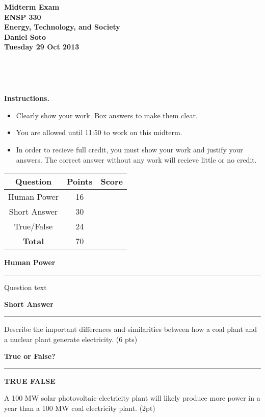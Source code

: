 \documentclass[12pt, oneside]{article}
\newif\ifsolution
\newcommand{\tf}[1]
{
\vfill
\parbox[t]{0.25\textwidth}{\bf TRUE \hspace{0.1 in} FALSE }
\parbox[t]{0.75\textwidth}{#1 (2pt)}
}
\newcommand{\tablerow}[2]
{\rule[-0.3cm]{0cm}{1cm}#1 & #2 & \\ \hline}
\newcommand{\chead}[1]
{\begin{center}\large\textbf{#1}\end{center}
\hrule
\vspace{10pt}}
\newcommand{\solution}[1]
{\ifsolution
Answer: {\it #1}
\else\fi}
\begin{document}
\begin{center}
{\bf Midterm Exam}\\
{\bf ENSP 330}\\
{\bf Energy, Technology, and Society}\\
{\bf Daniel Soto}\\
{\bf Tuesday 29 Oct 2013}\\
\end{center}


\framebox[4.5in]{\rule{0cm}{1.5cm}}\\
\vspace{0.2cm}

\framebox[4.5in]{\rule{0cm}{1.5cm}}\\
\vspace{0.8cm}


\noindent
{\bf Instructions.}
\begin{itemize}
\item Clearly show your work.  Box answers to make them clear.
\item You are allowed until 11:50 to work on this midterm.
\item In order to recieve full credit, you must show your work and
justify your answers.  The correct answer without any work will recieve
little or no credit.
\end{itemize}

\vfill

\begin{center}
\begin{tabular}{|c|c|c|}
\hline
\rule[-0.3cm]{0cm}{1cm}
Question & Points & Score \\
\hline
\tablerow{Human Power}{16}
\tablerow{Short Answer}{30}
\tablerow{True/False}{24}
\tablerow{\bf{Total}}{70}
\end{tabular}
\end{center}

\vfill


%
%

\newpage
\chead{Human Power}

Question text

\solution{Power}




\newpage
\chead{Short Answer}

Describe the important differences and similarities between how a coal
plant and a nuclear plant generate electricity. (6 pts)

\solution{Differences: The main difference is in the source of heat.  A
coal plant uses combustion of coal while a nuclear plant uses a chain
reaction of nuclear fission to create heat.

Similarities: The main
similarity is in the use of steam turbines to generate electricity
through a steam heat engine.}

\vfill

\newpage
\chead{True or False?}

\tf{A 100 MW solar photovoltaic electricity plant will likely produce
more power in a year than a 100 MW coal electricity plant.}
\solution{False}
\end{document}
